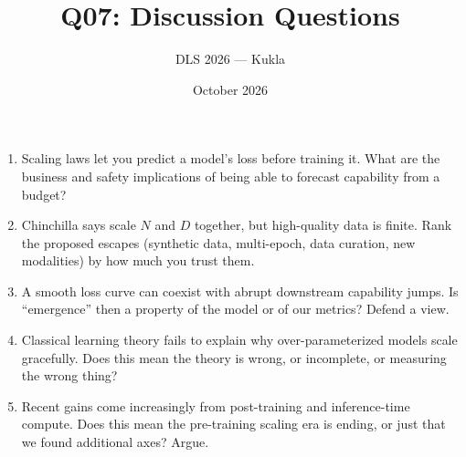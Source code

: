 \documentclass[11pt]{article}
\title{Q07: Discussion Questions}
\author{DLS 2026 --- Kukla}
\date{October 2026}
\begin{document}
\maketitle
\begin{enumerate}[leftmargin=1.5em]
\item Scaling laws let you predict a model's loss before training it. What are the business and safety implications of being able to forecast capability from a budget?
\item Chinchilla says scale $N$ and $D$ together, but high-quality data is finite. Rank the proposed escapes (synthetic data, multi-epoch, data curation, new modalities) by how much you trust them.
\item A smooth loss curve can coexist with abrupt downstream capability jumps. Is ``emergence'' then a property of the model or of our metrics? Defend a view.
\item Classical learning theory fails to explain why over-parameterized models scale gracefully. Does this mean the theory is wrong, or incomplete, or measuring the wrong thing?
\item Recent gains come increasingly from post-training and inference-time compute. Does this mean the pre-training scaling era is ending, or just that we found additional axes? Argue.
\end{enumerate}
\end{document}

